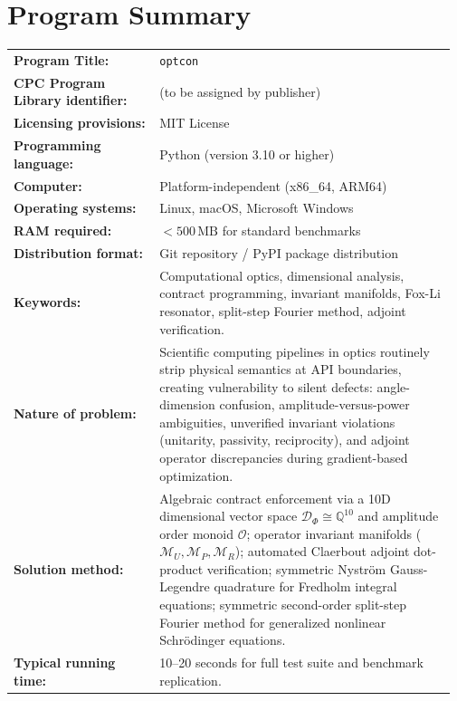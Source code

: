 \documentclass[preprint,12pt]{elsarticle}
\begin{document}
\section*{Program Summary}
\small
\noindent
\begin{tabular*}{\linewidth}{@{\extracolsep{\fill}} p{0.32\linewidth} p{0.65\linewidth} @{}}
\toprule
\textbf{Program Title:} & \texttt{optcon} \\
\textbf{CPC Program Library identifier:} & (to be assigned by publisher) \\
\textbf{Licensing provisions:} & MIT License \\
\textbf{Programming language:} & Python (version 3.10 or higher) \\
\textbf{Computer:} & Platform-independent (x86\_64, ARM64) \\
\textbf{Operating systems:} & Linux, macOS, Microsoft Windows \\
\textbf{RAM required:} & $< 500\,\mathrm{MB}$ for standard benchmarks \\
\textbf{Distribution format:} & Git repository / PyPI package distribution \\
\textbf{Keywords:} & Computational optics, dimensional analysis, contract programming, invariant manifolds, Fox-Li resonator, split-step Fourier method, adjoint verification. \\
\textbf{Nature of problem:} & Scientific computing pipelines in optics routinely strip physical semantics at API boundaries, creating vulnerability to silent defects: angle-dimension confusion, amplitude-versus-power ambiguities, unverified invariant violations (unitarity, passivity, reciprocity), and adjoint operator discrepancies during gradient-based optimization. \\
\textbf{Solution method:} & Algebraic contract enforcement via a 10D dimensional vector space $\mathcal{D}_\Phi \cong \mathbb{Q}^{10}$ and amplitude order monoid $\mathcal{O}$; operator invariant manifolds ($\mathcal{M}_U, \mathcal{M}_P, \mathcal{M}_R$); automated Claerbout adjoint dot-product verification; symmetric Nystr\"om Gauss-Legendre quadrature for Fredholm integral equations; symmetric second-order split-step Fourier method for generalized nonlinear Schr\"odinger equations. \\
\textbf{Typical running time:} & 10--20 seconds for full test suite and benchmark replication. \\
\bottomrule
\end{tabular*}
\normalsize
\end{document}
